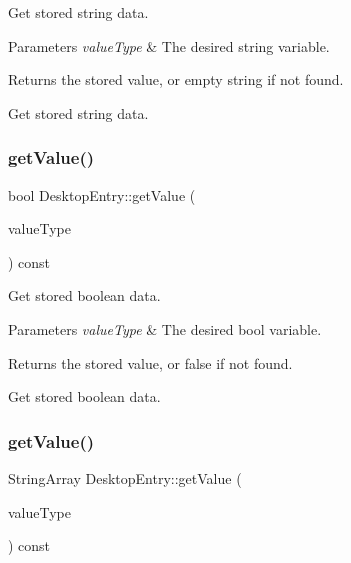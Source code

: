 Get stored string data.


\begin{DoxyParams}{Parameters}
{\em value\+Type} & The desired string variable.\\
\hline
\end{DoxyParams}
\begin{DoxyReturn}{Returns}
the stored value, or empty string if not found.
\end{DoxyReturn}
Get stored string data. \mbox{\label{classDesktopEntry_abdd59b33e74462aa82429e3f0a7bec23}} 
\subsubsection{\texorpdfstring{get\+Value()}{getValue()}\hspace{0.1cm}{\footnotesize\ttfamily [2/3]}}
{\footnotesize\ttfamily bool Desktop\+Entry\+::get\+Value (\begin{DoxyParamCaption}\item[{\mbox{\hyperlink{classDesktopEntry_ae44a005f0d494b8aeb422ec165517b60}{Bool\+Value}}}]{value\+Type }\end{DoxyParamCaption}) const}

Get stored boolean data.


\begin{DoxyParams}{Parameters}
{\em value\+Type} & The desired bool variable.\\
\hline
\end{DoxyParams}
\begin{DoxyReturn}{Returns}
the stored value, or false if not found.
\end{DoxyReturn}
Get stored boolean data. \mbox{\label{classDesktopEntry_a1c99eacb25e23be574c42f17efdbf7b8}} 
\subsubsection{\texorpdfstring{get\+Value()}{getValue()}\hspace{0.1cm}{\footnotesize\ttfamily [3/3]}}
{\footnotesize\ttfamily String\+Array Desktop\+Entry\+::get\+Value (\begin{DoxyParamCaption}\item[{\mbox{\hyperlink{classDesktopEntry_a1b40a3ef9c679a58d3f065d2d183cad0}{List\+Value}}}]{value\+Type }\end{DoxyParamCaption}) const}

